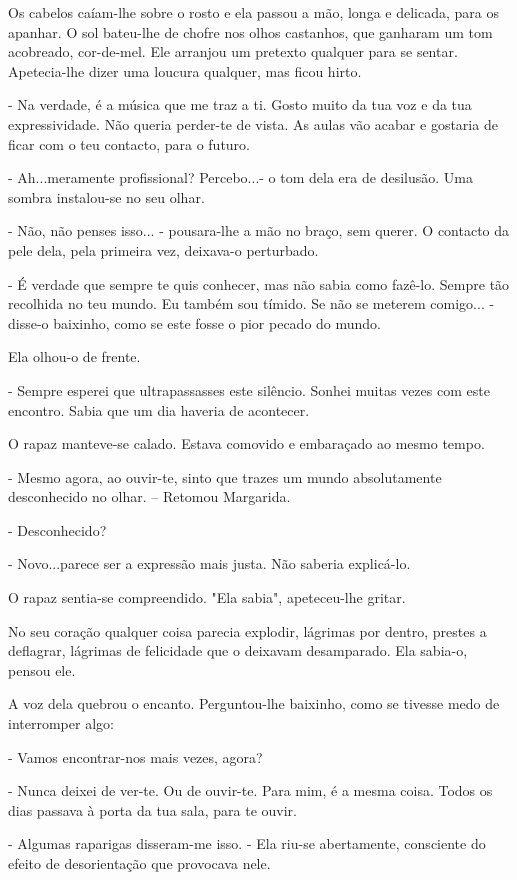 Os cabelos caíam-lhe sobre o rosto e ela passou a mão, longa e delicada,
para os apanhar. O sol bateu-lhe de chofre nos olhos castanhos, que
ganharam um tom acobreado, cor-de-mel. Ele arranjou um pretexto qualquer
para se sentar. Apetecia-lhe dizer uma loucura qualquer, mas ficou
hirto.

- Na verdade, é a música que me traz a ti. Gosto muito da tua voz e da
tua expressividade. Não queria perder-te de vista. As aulas vão acabar e
gostaria de ficar com o teu contacto, para o futuro.

- Ah...meramente profissional? Percebo...- o tom dela era de desilusão.
Uma sombra instalou-se no seu olhar.

- Não, não penses isso... - pousara-lhe a mão no braço, sem querer. O
contacto da pele dela, pela primeira vez, deixava-o perturbado.

- É verdade que sempre te quis conhecer, mas não sabia como fazê-lo.
Sempre tão recolhida no teu mundo. Eu também sou tímido. Se não se
meterem comigo... - disse-o baixinho, como se este fosse o pior pecado
do mundo.

Ela olhou-o de frente.

- Sempre esperei que ultrapassasses este silêncio. Sonhei muitas vezes
com este encontro. Sabia que um dia haveria de acontecer.

O rapaz manteve-se calado. Estava comovido e embaraçado ao mesmo tempo.

- Mesmo agora, ao ouvir-te, sinto que trazes um mundo absolutamente
desconhecido no olhar. -- Retomou Margarida.

- Desconhecido?

- Novo...parece ser a expressão mais justa. Não saberia explicá-lo.

O rapaz sentia-se compreendido. "Ela sabia", apeteceu-lhe gritar.

No seu coração qualquer coisa parecia explodir, lágrimas por dentro,
prestes a deflagrar, lágrimas de felicidade que o deixavam desamparado.
Ela sabia-o, pensou ele.

A voz dela quebrou o encanto. Perguntou-lhe baixinho, como se tivesse
medo de interromper algo:

- Vamos encontrar-nos mais vezes, agora?

- Nunca deixei de ver-te. Ou de ouvir-te. Para mim, é a mesma coisa.
Todos os dias passava à porta da tua sala, para te ouvir.

- Algumas raparigas disseram-me isso. - Ela riu-se abertamente,
consciente do efeito de desorientação que provocava nele.

